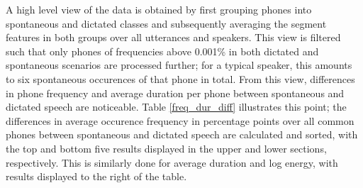 \documentclass[conference]{IEEEtran}
\begin{document}
A high level view of the data is obtained by first grouping phones into spontaneous and dictated classes and subsequently averaging the segment features in both groups over all utterances and speakers.
This view is filtered such that only phones of frequencies above 0.001\% in both dictated and spontaneous scenarios are processed further; for a typical speaker, this amounts to six spontaneous occurences of that phone in total.
From this view, differences in phone frequency and average duration per phone between spontaneous and dictated speech are noticeable.
Table \ref{freq_dur_diff} illustrates this point; the differences in average occurence frequency in percentage points over all common phones between spontaneous and dictated speech are calculated and sorted, with the top and bottom five results displayed in the upper and lower sections, respectively.
This is similarly done for average duration and log energy, with results displayed to the right of the table.
\end{document}
